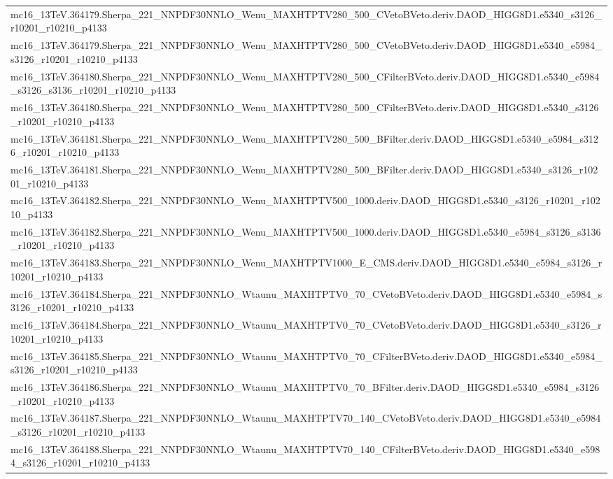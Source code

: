 \begin{adjustwidth}{-3em}{-3em}
\begin{longtable}{l}
mc16\_13TeV.364179.Sherpa\_221\_NNPDF30NNLO\_Wenu\_MAXHTPTV280\_500\_CVetoBVeto.deriv.DAOD\_HIGG8D1.e5340\_s3126\_r10201\_r10210\_p4133 \\
mc16\_13TeV.364179.Sherpa\_221\_NNPDF30NNLO\_Wenu\_MAXHTPTV280\_500\_CVetoBVeto.deriv.DAOD\_HIGG8D1.e5340\_e5984\_s3126\_r10201\_r10210\_p4133 \\
mc16\_13TeV.364180.Sherpa\_221\_NNPDF30NNLO\_Wenu\_MAXHTPTV280\_500\_CFilterBVeto.deriv.DAOD\_HIGG8D1.e5340\_e5984\_s3126\_s3136\_r10201\_r10210\_p4133 \\
mc16\_13TeV.364180.Sherpa\_221\_NNPDF30NNLO\_Wenu\_MAXHTPTV280\_500\_CFilterBVeto.deriv.DAOD\_HIGG8D1.e5340\_s3126\_r10201\_r10210\_p4133 \\
mc16\_13TeV.364181.Sherpa\_221\_NNPDF30NNLO\_Wenu\_MAXHTPTV280\_500\_BFilter.deriv.DAOD\_HIGG8D1.e5340\_e5984\_s3126\_r10201\_r10210\_p4133 \\
mc16\_13TeV.364181.Sherpa\_221\_NNPDF30NNLO\_Wenu\_MAXHTPTV280\_500\_BFilter.deriv.DAOD\_HIGG8D1.e5340\_s3126\_r10201\_r10210\_p4133 \\
mc16\_13TeV.364182.Sherpa\_221\_NNPDF30NNLO\_Wenu\_MAXHTPTV500\_1000.deriv.DAOD\_HIGG8D1.e5340\_s3126\_r10201\_r10210\_p4133 \\
mc16\_13TeV.364182.Sherpa\_221\_NNPDF30NNLO\_Wenu\_MAXHTPTV500\_1000.deriv.DAOD\_HIGG8D1.e5340\_e5984\_s3126\_s3136\_r10201\_r10210\_p4133 \\
mc16\_13TeV.364183.Sherpa\_221\_NNPDF30NNLO\_Wenu\_MAXHTPTV1000\_E\_CMS.deriv.DAOD\_HIGG8D1.e5340\_e5984\_s3126\_r10201\_r10210\_p4133 \\
mc16\_13TeV.364184.Sherpa\_221\_NNPDF30NNLO\_Wtaunu\_MAXHTPTV0\_70\_CVetoBVeto.deriv.DAOD\_HIGG8D1.e5340\_e5984\_s3126\_r10201\_r10210\_p4133 \\
mc16\_13TeV.364184.Sherpa\_221\_NNPDF30NNLO\_Wtaunu\_MAXHTPTV0\_70\_CVetoBVeto.deriv.DAOD\_HIGG8D1.e5340\_s3126\_r10201\_r10210\_p4133 \\
mc16\_13TeV.364185.Sherpa\_221\_NNPDF30NNLO\_Wtaunu\_MAXHTPTV0\_70\_CFilterBVeto.deriv.DAOD\_HIGG8D1.e5340\_e5984\_s3126\_r10201\_r10210\_p4133 \\
mc16\_13TeV.364186.Sherpa\_221\_NNPDF30NNLO\_Wtaunu\_MAXHTPTV0\_70\_BFilter.deriv.DAOD\_HIGG8D1.e5340\_e5984\_s3126\_r10201\_r10210\_p4133 \\
mc16\_13TeV.364187.Sherpa\_221\_NNPDF30NNLO\_Wtaunu\_MAXHTPTV70\_140\_CVetoBVeto.deriv.DAOD\_HIGG8D1.e5340\_e5984\_s3126\_r10201\_r10210\_p4133 \\
mc16\_13TeV.364188.Sherpa\_221\_NNPDF30NNLO\_Wtaunu\_MAXHTPTV70\_140\_CFilterBVeto.deriv.DAOD\_HIGG8D1.e5340\_e5984\_s3126\_r10201\_r10210\_p4133 \\

\end{longtable}
\end{adjustwidth}
